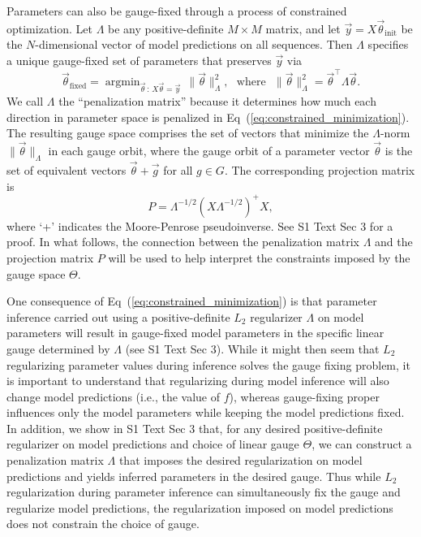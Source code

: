 \documentclass[10pt,letterpaper]{article}
\newcommand{\eq}[1]{Eq\ (\ref{#1})}
\newcommand{\si}[1]{{S1 Text Sec #1}}
\newcommand{\myfixed}{\textrm{fixed}}
\DeclareMathOperator*{\argmin}{argmin}
\begin{document}
Parameters can also be gauge-fixed through a process of constrained optimization. Let $\Lambda$ be any positive-definite $M \times M$ matrix, and let $\vec{y} = X \vec{\theta}_\mathrm{init}$ be the $N$-dimensional vector of model predictions on all sequences. Then $\Lambda$ specifies a unique gauge-fixed set of parameters that preserves $\vec{y}$ via
\begin{equation}
    \vec{\theta}_\myfixed = \argmin_{\vec{\theta}\,:\, X \vec{\theta} = \vec{y}}\,  \lVert  \vec{\theta}\rVert_\Lambda^2, 
    ~~~\textrm{where}~~~
    \lVert \vec{\theta} \rVert_\Lambda^2 = \vec{\theta}^\top \Lambda \vec{\theta}. \label{eq:constrained_minimization}
\end{equation}
We call $\Lambda$ the ``penalization matrix'' because it determines how much each direction in parameter space is penalized in \eq{eq:constrained_minimization}. The resulting gauge space comprises the set of vectors that minimize the $\Lambda$-norm $\lVert \vec{\theta} \rVert_\Lambda$ in each gauge orbit, where the gauge orbit of a parameter vector $\vec{\theta}$ is the set of equivalent vectors $\vec{\theta} + \vec{g}$ for all $g \in G$. The corresponding projection matrix is
\begin{equation}
    P = \Lambda^{-1/2} (X\Lambda^{-1/2})^+ X, \label{eq:P_Lambda}
\end{equation}
where `+' indicates the Moore-Penrose pseudoinverse. See \si{3} for a proof. In what follows, the connection between the penalization matrix $\Lambda$ and the projection matrix $P$ will be used to help interpret the constraints imposed by the gauge space $\Theta$.

One consequence of \eq{eq:constrained_minimization} is that parameter inference carried out using a positive-definite $L_2$ regularizer $\Lambda$ on model parameters will result in gauge-fixed model parameters in the specific linear gauge determined by $\Lambda$  (see \si{3}). While it might then seem that $L_2$ regularizing parameter values during inference solves the gauge fixing problem, it is important to understand that regularizing during model inference will also change model predictions (i.e., the value of $f$), whereas gauge-fixing proper influences only the model parameters while keeping the model predictions fixed. In addition, we show in \si{3} that, for any desired positive-definite regularizer on model predictions and choice of linear gauge $\Theta$, we can construct a penalization matrix $\Lambda$ that imposes the desired regularization on model predictions and yields inferred parameters in the desired gauge. Thus while $L_2$ regularization during parameter inference can simultaneously fix the gauge and regularize model predictions, the regularization imposed on model predictions does not constrain the choice of gauge.
\end{document}
